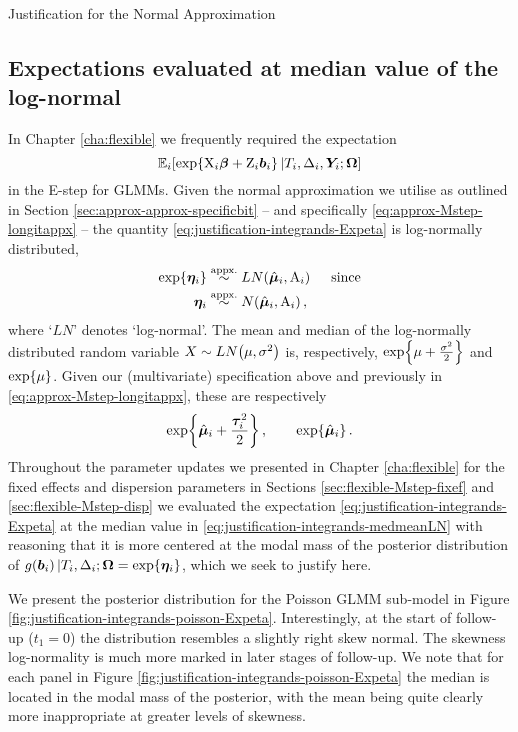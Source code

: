 \begin{chapter}{\label{cha:justification}Justification for the Normal Approximation}
  \subsection{Expectations evaluated at median value of the log-normal}\label{sec:justification-integrands-medians}
  In Chapter \ref{cha:flexible} we frequently required the expectation
  \begin{equation}
      \mathbb{E}_i\!\left[\exp\!\left\{\mathrm{X}_i\bm{\beta}+\mathrm{Z}_i\bm{b}_i\right\}|T_i,\Delta_i,\bm{Y}_i;\bm{\mathrm{\Omega}}\right]
  \label{eq:justification-integrands-Expeta}
  \end{equation}
  in the E-step for GLMMs. Given the normal approximation we utilise as outlined in Section \ref{sec:approx-approx-specificbit} -- and specifically \eqref{eq:approx-Mstep-longitappx} -- the quantity \eqref{eq:justification-integrands-Expeta} is log-normally distributed, \ie
  \begin{align*}
      \exp\lbr\linp\rbr&\appx LN\lb\hbmu,\Amat\rb\quad\ \mathrm{since}\\
      \linp&\appx N\lb\hbmu,\Amat\rb,
  \end{align*}
  where `$LN$' denotes `log-normal'. The mean and median of the log-normally distributed random variable $X\sim LN\!\left(\mu,\sigma^2\right)$ is, respectively, $\exp\!\left\{\mu+\frac{\sigma^2}{2}\right\}$ and $\exp\!\left\{\mu\right\}$. Given our (multivariate) specification above and previously in \eqref{eq:approx-Mstep-longitappx}, these are respectively
  \begin{equation}
      \begin{aligned}
          \exp\!\left\{\hat{\bm{\mu}}_i+\frac{\bm{\tau}_i^2}{2}\right\},\qquad\exp\!\left\{\hat{\bm{\mu}}_i\right\}.
      \end{aligned}
  \label{eq:justification-integrands-medmeanLN}
  \end{equation}
  Throughout the parameter updates we presented in Chapter \ref{cha:flexible} for the fixed effects and dispersion parameters in Sections \ref{sec:flexible-Mstep-fixef} and \ref{sec:flexible-Mstep-disp} we evaluated the expectation \eqref{eq:justification-integrands-Expeta} at the median value in \eqref{eq:justification-integrands-medmeanLN} with reasoning that it is more centered at the modal mass of the posterior distribution of $g\!\left(\bm{b}_i\right)|T_i,\Delta_i;\bm{\mathrm{\Omega}}=\exp\!\left\{\bm{\eta}_i\right\}$, which we seek to justify here.

  We present the posterior distribution for the Poisson GLMM sub-model in Figure \ref{fig:justification-integrands-poisson-Expeta}. Interestingly, at the start of follow-up ($t_1=0$) the distribution resembles a slightly right skew normal. The skewness \ie log-normality is much more marked in later stages of follow-up. We note that for each panel in Figure \ref{fig:justification-integrands-poisson-Expeta} the median is located in the modal mass of the posterior, with the mean being quite clearly more inappropriate at greater levels of skewness.


\end{chapter}
